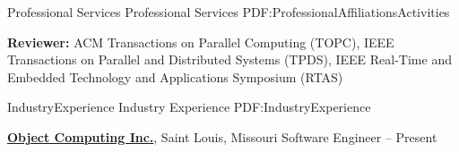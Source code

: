 \documentclass[letterpaper,MMMyyyy,nonstopmode]{simpleresumecv}
\begin{document}
\begin{Body}
\Section
{Professional Services}
{Professional Services}
{PDF:ProfessionalAffiliationsActivities}

\Entry
{\textbf{Reviewer:} ACM Transactions on Parallel Computing (TOPC), 
IEEE Transactions on Parallel and Distributed Systems (TPDS), IEEE Real-Time and Embedded Technology and 
Applications Symposium (RTAS)}



\begin{comment}

\Section
{Campus Activities}
{Campus Activities}
{PDF:CampusActivities}

\Entry
\href{http://www.example.com/my-club}
{\textbf{First Volunteers Club}},
First American University

\Gap
\BulletItem
President
\hfill
\DatestampYMD{2006}{08}{15} --
\DatestampYMD{2007}{08}{15}
\begin{Detail}
\SubBulletItem
Lorem ipsum dolor sit amet, consectetur adipiscing elit.
\SubBulletItem
Curabitur vitae laoreet velit, vel ultricies est. Nam nec elit ac ante facilisis ultrices.
\SubBulletItem
Integer sit amet turpis dolor. Lorem ipsum dolor sit amet, consectetur adipiscing elit. Nunc at orci eu leo vulputate finibus sed et sem.
\SubBulletItem
Suspendisse volutpat sapien et mi cursus, gravida ornare mauris sollicitudin.
\end{Detail}

\end{comment}



\Section
{Industry\newline Experience}
{Industry Experience}
{PDF:IndustryExperience}

\Entry
\href{https://objectcomputing.com/}
{\textbf{Object Computing Inc.}}, Saint Louis, Missouri
\Gap
\BulletItem
Software Engineer
\hfill
{} -- Present
\BigGap


\end{Body}
\end{document}
